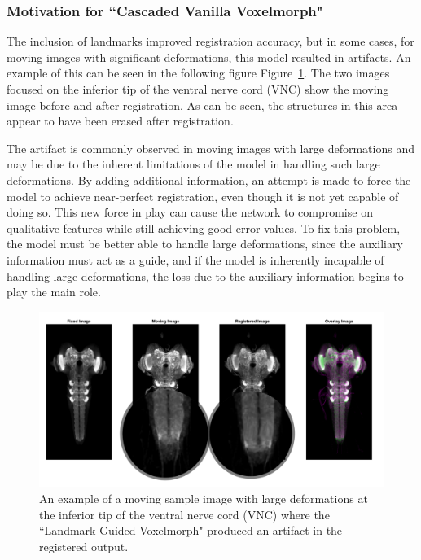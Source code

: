 \documentclass{book}
\begin{document}
	\subsubsection{Motivation for ``Cascaded Vanilla Voxelmorph"}
	The inclusion of landmarks improved registration accuracy, but in some cases, for moving images with significant deformations, this model resulted in artifacts. An example of this can be seen in the following figure Figure~\ref{fig:method2_artifact}. The two images focused on the inferior tip of the ventral nerve cord (VNC) show the moving image before and after registration. As can be seen, the structures in this area appear to have been erased after registration. 
	
	The artifact is commonly observed in moving images with large deformations and may be due to the inherent limitations of the model in handling such large deformations. By adding additional information, an attempt is made to force the model to achieve near-perfect registration, even though it is not yet capable of doing so. This new force in play can cause the network to compromise on qualitative features while still achieving good error values. To fix this problem, the model must be better able to handle large deformations, since the auxiliary information must act as a guide, and if the model is inherently incapable of handling large deformations, the loss due to the auxiliary information begins to play the main role.
	
	\begin{figure}[h!]
		\centering
		\includegraphics[width=0.9\columnwidth]{resources/chapter4/method2/np_52B07_52H01_MB262B_021713B_scaled.png}
		\caption{An example of a moving sample image with large deformations at the inferior tip of the ventral nerve cord (VNC) where the ``Landmark Guided Voxelmorph" produced an artifact in the registered output.}
		\label{fig:method2_artifact}
	\end{figure}
	
\end{document}
